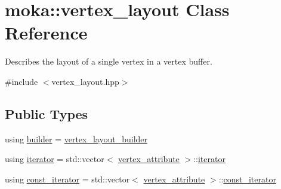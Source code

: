 \hypertarget{classmoka_1_1vertex__layout}{}\section{moka\+::vertex\+\_\+layout Class Reference}
\label{classmoka_1_1vertex__layout}


Describes the layout of a single vertex in a vertex buffer.  




{\ttfamily \#include $<$vertex\+\_\+layout.\+hpp$>$}

\subsection*{Public Types}
\begin{DoxyCompactItemize}
\item 
using \mbox{\hyperlink{classmoka_1_1vertex__layout_a86a0831b6de104852cc46d38762a339d}{builder}} = \mbox{\hyperlink{structmoka_1_1vertex__layout__builder}{vertex\+\_\+layout\+\_\+builder}}
\item 
using \mbox{\hyperlink{classmoka_1_1vertex__layout_ae9f116229b2836d428a9d39d41028058}{iterator}} = std\+::vector$<$ \mbox{\hyperlink{structmoka_1_1vertex__attribute}{vertex\+\_\+attribute}} $>$\+::\mbox{\hyperlink{classmoka_1_1vertex__layout_ae9f116229b2836d428a9d39d41028058}{iterator}}
\item 
using \mbox{\hyperlink{classmoka_1_1vertex__layout_ab39e7bec44dbfcac3d5154f8574b198c}{const\+\_\+iterator}} = std\+::vector$<$ \mbox{\hyperlink{structmoka_1_1vertex__attribute}{vertex\+\_\+attribute}} $>$\+::\mbox{\hyperlink{classmoka_1_1vertex__layout_ab39e7bec44dbfcac3d5154f8574b198c}{const\+\_\+iterator}}
\end{DoxyCompactItemize}
